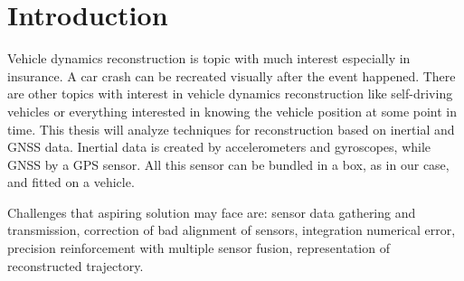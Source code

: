 \chapter{Introduction}
\label{chap:intro}

Vehicle dynamics reconstruction is topic with much interest especially in insurance. A car crash can be recreated visually after the event happened. There are other topics with interest in vehicle dynamics reconstruction like self-driving vehicles or everything interested in knowing the vehicle position at some point in time.
This thesis will analyze techniques for reconstruction based on inertial and GNSS data.
Inertial data is created by accelerometers and gyroscopes, while GNSS by a GPS sensor.
All this sensor can be bundled in a box, as in our case, and fitted on a vehicle.


Challenges that aspiring solution may face are: sensor data gathering and transmission, correction of bad alignment of sensors, integration numerical error, precision reinforcement with multiple sensor fusion, representation of reconstructed trajectory.

